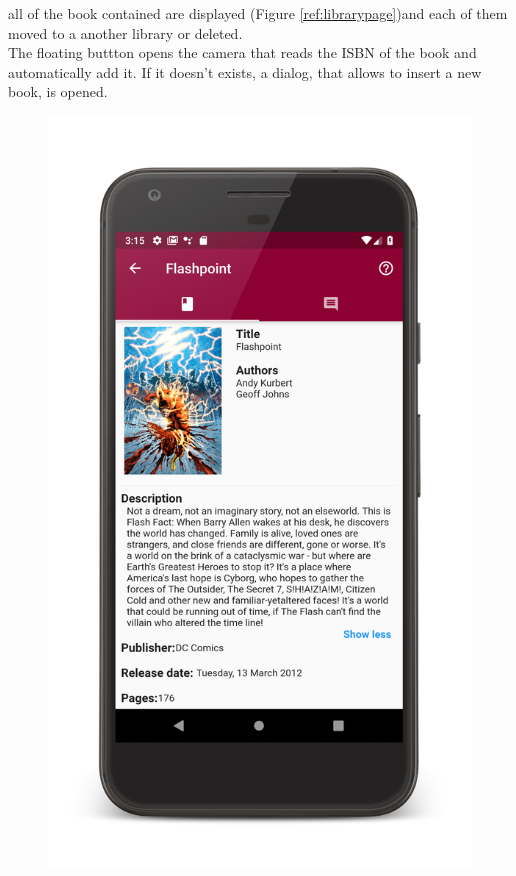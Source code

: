 all of the book contained are displayed (Figure \ref{ref:librarypage})and each of them moved to a another library or deleted.\\ 
The floating buttton opens the camera that reads the ISBN of the book and automatically add it. 
If it doesn’t exists, a dialog, that allows to insert a new book, is opened.
\clearpage
\begin{figure}[!htb]
    \begin{minipage}[b]{0.3\textwidth}
        \centering
        \includegraphics[scale=0.09]{images/book-info-page.png}

\end{minipage}
\end{figure}
